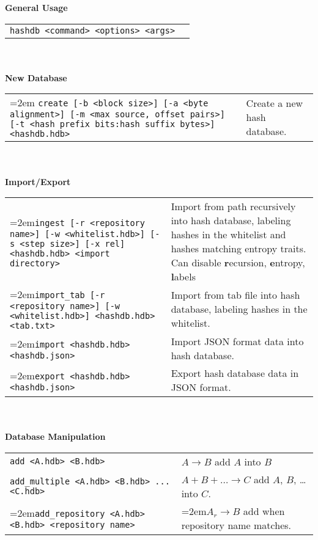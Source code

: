 \begin{footnotesize}
\textbf{General Usage} \\
\begin{tabular}{p{3.6 in} p{3.0 in}}
\texttt{hashdb <command> <options> <args>} & \\
\end{tabular}
\\
\\
\textbf{New Database} \\
\begin{tabular}{p{3.6 in} p{3.0 in}}
\hangindent=2em \texttt{create [-b <block size>] [-a <byte alignment>] [-m <max source, offset pairs>] [-t <hash prefix bits:hash suffix bytes>] <hashdb.hdb>} &
Create a new hash database.\\
\end{tabular}
\\
\\
\textbf{Import/Export} \\
\begin{tabular}{p{3.6 in} p{3.0 in}}
\hangindent=2em\texttt{ingest [-r <repository name>] [-w <whitelist.hdb>] [-s <step size>] [-x rel] <hashdb.hdb> <import directory>} &
Import from path recursively into hash database, labeling hashes in the whitelist and hashes matching entropy traits.  Can disable \textbf{r}ecursion, \textbf{e}ntropy, \textbf{l}abels \\
\hangindent=2em\texttt{import\_tab [-r <repository name>] [-w <whitelist.hdb>] <hashdb.hdb> <tab.txt>} &
Import from tab file into hash database, labeling hashes in the whitelist.\\
\hangindent=2em\texttt{import <hashdb.hdb> <hashdb.json>} &
Import JSON format data into hash database.\\
\hangindent=2em\texttt{export <hashdb.hdb> <hashdb.json>} &
Export hash database data in JSON format.\\
\end{tabular}
\\
\\
\textbf{Database Manipulation} \\
\begin{tabular}{p{3.6 in} p{3.0 in}}
\texttt{add <A.hdb> <B.hdb>} & $A \rightarrow B$ add $A$ into $B$ \\
\texttt{add\_multiple <A.hdb> <B.hdb> ... <C.hdb>} & $A + B + \ldots \rightarrow C$ add $A$, $B$, \ldots into $C$.\\
\hangindent=2em\texttt{add\_repository <A.hdb> <B.hdb> <repository name>} & \hangindent=2em$A_r \rightarrow B$ add when repository name matches.\\

\end{tabular}
\end{footnotesize}
